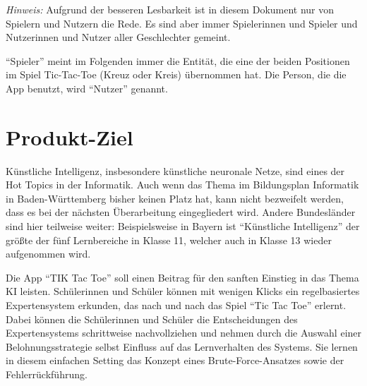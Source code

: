 \documentclass[titlepage]{scrartcl}
\title{\TicTacToe}
\subtitle{Product Backlog}
\date{Stand: \today}
\author{Jonas, Luis, Leonid}
\newcommand{\TicTacToe}{TI\reflectbox K Tac Toe}
\begin{document}
\maketitle


\emph{Hinweis:} Aufgrund der besseren Lesbarkeit ist in diesem Dokument nur von Spielern und Nutzern die Rede.
Es sind aber immer Spielerinnen und Spieler und Nutzerinnen und Nutzer aller Geschlechter gemeint.

"`Spieler"' meint im Folgenden immer die Entität, die eine der beiden Positionen im Spiel Tic-Tac-Toe (Kreuz oder Kreis) übernommen hat.
Die Person, die die App benutzt, wird "`Nutzer"' genannt.

\section{Produkt-Ziel}%
Künstliche Intelligenz, insbesondere künstliche neuronale Netze, sind eines der Hot Topics in der Informatik.
Auch wenn das Thema im Bildungsplan Informatik in Baden-Württemberg bisher keinen Platz hat, kann nicht bezweifelt werden, dass es bei der nächsten Überarbeitung eingegliedert wird.
Andere Bundesländer sind hier teilweise weiter: Beispielsweise in Bayern ist "`Künstliche Intelligenz"' der größte der fünf Lernbereiche in Klasse 11, welcher auch in Klasse 13 wieder aufgenommen wird.

Die App "`\TicTacToe"' soll einen Beitrag für den sanften Einstieg in das Thema KI leisten.
Schülerinnen und Schüler können mit wenigen Klicks ein regelbasiertes Expertensystem erkunden, das nach und nach das Spiel "`Tic Tac Toe"' erlernt.
Dabei können die Schülerinnen und Schüler die Entscheidungen des Expertensystems schrittweise nachvollziehen und nehmen durch die Auswahl einer Belohnungsstrategie selbst Einfluss auf das Lernverhalten des Systems.
Sie lernen in diesem einfachen Setting das Konzept eines Brute-Force-Ansatzes sowie der Fehlerrückführung.
\end{document}
